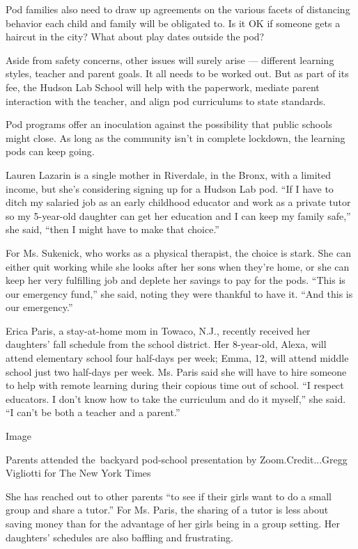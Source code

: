 Pod families also need to draw up agreements on the various facets of
distancing behavior each child and family will be obligated to. Is it OK
if someone gets a haircut in the city? What about play dates outside the
pod?

Aside from safety concerns, other issues will surely arise --- different
learning styles, teacher and parent goals. It all needs to be worked
out. But as part of its fee, the Hudson Lab School will help with the
paperwork, mediate parent interaction with the teacher, and align pod
curriculums to state standards.

Pod programs offer an inoculation against the possibility that public
schools might close. As long as the community isn't in complete
lockdown, the learning pods can keep going.

Lauren Lazarin is a single mother in Riverdale, in the Bronx, with a
limited income, but she's considering signing up for a Hudson Lab pod.
``If I have to ditch my salaried job as an early childhood educator and
work as a private tutor so my 5-year-old daughter can get her education
and I can keep my family safe,'' she said, ``then I might have to make
that choice.''

For Ms. Sukenick, who works as a physical therapist, the choice is
stark. She can either quit working while she looks after her sons when
they're home, or she can keep her very fulfilling job and deplete her
savings to pay for the pods. ``This is our emergency fund,'' she said,
noting they were thankful to have it. ``And this is our emergency.''

Erica Paris, a stay-at-home mom in Towaco, N.J., recently received her
daughters' fall schedule from the school district. Her 8-year-old,
Alexa, will attend elementary school four half-days per week; Emma, 12,
will attend middle school just two half-days per week. Ms. Paris said
she will have to hire someone to help with remote learning during their
copious time out of school. ``I respect educators. I don't know how to
take the curriculum and do it myself,'' she said. ``I can't be both a
teacher and a parent.''

Image

Parents attended the~backyard pod-school presentation by
Zoom.Credit...Gregg Vigliotti for The New York Times

She has reached out to other parents ``to see if their girls want to do
a small group and share a tutor.'' For Ms. Paris, the sharing of a tutor
is less about saving money than for the advantage of her girls being in
a group setting. Her daughters' schedules are also baffling and
frustrating.

